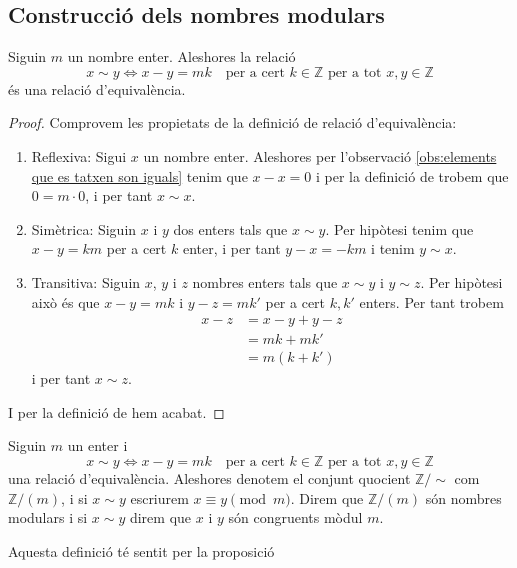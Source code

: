 \documentclass[../Apunts.tex]{subfiles}
\begin{document}
	\subsection{Construcció dels nombres modulars}
	\begin{proposition}
		\label{prop:relació d'equivalència Z/(m)}
		Siguin \(m\) un nombre enter. Aleshores la relació
		\[x\sim y\Longleftrightarrow x-y=mk\quad\text{per a cert }k\in\mathbb{Z}\text{ per a tot }x,y\in\mathbb{Z}\]
		és una relació d'equivalència.
		\begin{proof}
			Comprovem les propietats de la definició de relació d'equivalència:
			\begin{enumerate}
				\item Reflexiva: Sigui \(x\) un nombre enter. Aleshores per l'observació \ref{obs:elements que es tatxen son iguals} tenim que \(x-x=0\) i per la definició de  trobem que \(0=m\cdot 0\), i per tant \(x\sim x\).
				\item Simètrica: Siguin \(x\) i \(y\) dos enters tals que \(x\sim y\). Per hipòtesi tenim que \(x-y=km\) per a cert \(k\) enter, i per tant \(y-x=-km\) i tenim \(y\sim x\).
				\item Transitiva: Siguin \(x\), \(y\) i \(z\) nombres enters tals que \(x\sim y\) i \(y\sim z\). Per hipòtesi això és que \(x-y=mk\) i \(y-z=mk'\) per a cert \(k,k'\) enters. Per tant trobem
				\begin{align*}
				x-z&=x-y+y-z\\
				&=mk+mk'\\
				&=m(k+k')
				\end{align*}
				i per tant \(x\sim z\).
			\end{enumerate}
			I per la definició de  hem acabat.
		\end{proof}
	\end{proposition}
	\begin{definition}
		\label{def:nombres modulars}\label{def:Z/(m)}
		\label{def:nombres modulars congruents}
		Siguin \(m\) un enter i
		\[x\sim y\Longleftrightarrow x-y=mk\quad\text{per a cert }k\in\mathbb{Z}\text{ per a tot }x,y\in\mathbb{Z}\]
		una relació d'equivalència. Aleshores denotem el conjunt quocient \(\mathbb{Z}/\sim\) com \(\mathbb{Z}/(m)\), i si \(x\sim y\) escriurem \(x\equiv y\pmod{m}\). Direm que \(\mathbb{Z}/(m)\) són nombres modulars i si \(x\sim y\) direm que \(x\) i \(y\) són congruents mòdul \(m\).
		
		Aquesta definició té sentit per la proposició 
	\end{definition}
\end{document}
